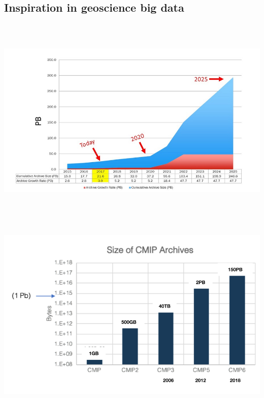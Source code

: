 \documentclass[a0, landscape]{a0poster}
\begin{document}
\begin{multicols}{3}
\subsection*{Inspiration in geoscience big data}
\includegraphics[height=10cm]{EOSDIS_archive_growth_updated_resize}
\includegraphics[height=10cm]{cmip-size}


\end{multicols}
\end{document}
